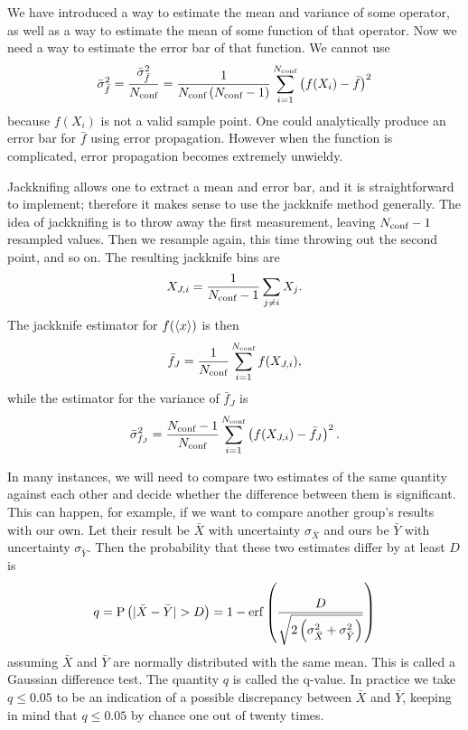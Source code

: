 We have introduced a way to estimate the mean and variance of some
operator, as well as a way to estimate the mean of some function of
that operator. Now we need a way to estimate the error bar of that
function. We cannot use
\begin{equation}
  \bar{\sigma}^2_{\bar{f}}=\frac{\bar{\sigma}^2_{\bar{f}}}{N_{\text{conf}}}
    =\frac{1}{N_{\text{conf}}\,(N_{\text{conf}}-1)}\sum_{i=1}^{N_{\text{conf}}}
     \left(f(X_i)-\bar{f}\right)^2
\end{equation}
because $f(X_i)$ is not a valid sample point.
One could analytically produce an error bar for $\bar{f}$ 
using error propagation. However when the function is complicated, 
error propagation becomes extremely unwieldy.

Jackknifing allows one to extract a mean and error bar,
and it is straightforward to implement; 
therefore it makes sense to use the jackknife method generally.
The idea of jackknifing is to throw away the first measurement, 
leaving $N_{\text{conf}}-1$ resampled values. Then we resample again, this
time throwing out the second point, and so on. The resulting
jackknife bins are
\begin{equation}
  X_{J,i}=\frac{1}{N_{\text{conf}}-1}\sum_{j\neq i}X_j.
\end{equation}
The jackknife estimator for $f(\ev{x})$ is then
\begin{equation}
  \bar{f}_J=\frac{1}{N_{\text{conf}}}\sum_{i=1}^{N_{\text{conf}}}f(X_{J,i}),
\end{equation}
while the estimator for the variance of $\bar{f}_J$ is
\begin{equation}
  \bar{\sigma}^2_{f_J}=\frac{N_{\text{conf}}-1}{N_{\text{conf}}}\sum_{i=1}^{N_{\text{conf}}}
    \left(f(X_{J,i})-\bar{f}_J\right)^2.
\end{equation}

In many instances, we will need to compare two estimates 
of the same quantity against each other and decide whether the difference 
between them is significant. This can happen, for example, if we want to
compare another group's results with our own. Let their result
be $\bar{X}$ with uncertainty $\sigma_{\bar{X}}$ and ours be
$\bar{Y}$ with uncertainty $\sigma_{\bar{Y}}$. Then the probability
that these two estimates differ by at least $D$ is
\begin{equation}\index{Gaussian difference test}
  q=\pr{|\bar{X}-\bar{Y}|>D}
    =1-\erf\left(\frac{D}{\sqrt{2
     \left(\sigma_{\bar{X}}^2+\sigma_{\bar{Y}}^2\right)}}\right)
\end{equation}
assuming $\bar{X}$ and $\bar{Y}$ are normally distributed with
the same mean. This is called a Gaussian difference test. 
The quantity $q$ is called the q-value.
In practice we take $q\leq0.05$ to be an indication of a possible 
discrepancy between $\bar{X}$ and $\bar{Y}$, keeping in mind that 
$q\leq0.05$ by chance one out of twenty times.

